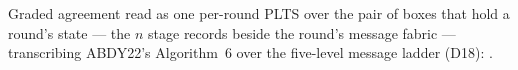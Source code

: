 \begin{definition}
  \label{def:aba-gbca-impl}
  \leanok
  Graded agreement read as one per-round PLTS over the pair of boxes that hold a round's state --- the $n$ stage records beside the round's message fabric --- transcribing ABDY22's Algorithm~6 over the five-level message ladder (D18): .
\end{definition}
